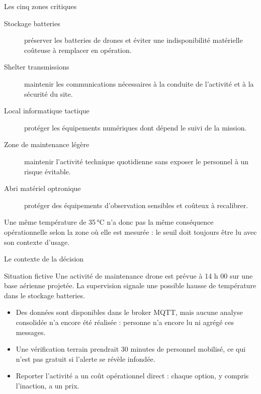 \documentclass[aspectratio=169]{beamer}
\begin{document}
\begin{frame}{Les cinq zones critiques}
  \begin{description}
    \item[Stockage batteries] préserver les batteries de drones et éviter une indisponibilité matérielle coûteuse à remplacer en opération.
    \item[Shelter transmissions] maintenir les communications nécessaires à la conduite de l'activité et à la sécurité du site.
    \item[Local informatique tactique] protéger les équipements numériques dont dépend le suivi de la mission.
    \item[Zone de maintenance légère] maintenir l'activité technique quotidienne sans exposer le personnel à un risque évitable.
    \item[Abri matériel optronique] protéger des équipements d'observation sensibles et coûteux à recalibrer.
  \end{description}
  \vfill
  \normalsize Une même température de 35\,°C n'a donc pas la même conséquence opérationnelle selon la zone où elle est mesurée : le seuil doit toujours être lu avec son contexte d'usage.
\end{frame}

\begin{frame}{Le contexte de la décision}
  \begin{block}{Situation fictive}
    Une activité de maintenance drone est prévue à 14 h 00 sur une base aérienne projetée. La supervision signale une possible hausse de température dans le stockage batteries.
  \end{block}
  \begin{itemize}
    \item Des données sont disponibles dans le broker MQTT, mais aucune analyse consolidée n'a encore été réalisée : personne n'a encore lu ni agrégé ces messages.
    \item Une vérification terrain prendrait 30 minutes de personnel mobilisé, ce qui n'est pas gratuit si l'alerte se révèle infondée.
    \item Reporter l'activité a un coût opérationnel direct : chaque option, y compris l'inaction, a un prix.
  \end{itemize}
\end{frame}
\end{document}
